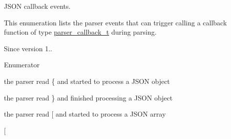 J\+S\+O\+N callback events. 

This enumeration lists the parser events that can trigger calling a callback function of type \hyperlink{classnlohmann_1_1basic__json_a9e35475e2027520a78e09f460dbe048a}{parser\+\_\+callback\+\_\+t} during parsing.

 \begin{DoxySince}{Since}
version 1.. 
\end{DoxySince}
\begin{Desc}
\item[Enumerator]\par
\begin{description}
\item[{\em 
\hypertarget{classnlohmann_1_1basic__json_aea1c863b719b4ca5b77188c171bbfafeae73f17027cb0acbb537f29d0a6944b26}{}object\+\_\+start\label{classnlohmann_1_1basic__json_aea1c863b719b4ca5b77188c171bbfafeae73f17027cb0acbb537f29d0a6944b26}
}]the parser read {\ttfamily \{} and started to process a J\+S\+O\+N object \item[{\em 
\hypertarget{classnlohmann_1_1basic__json_aea1c863b719b4ca5b77188c171bbfafeaf63e2a2468a37aa4f394fcc3bcb8249c}{}object\+\_\+end\label{classnlohmann_1_1basic__json_aea1c863b719b4ca5b77188c171bbfafeaf63e2a2468a37aa4f394fcc3bcb8249c}
}]the parser read {\ttfamily \}} and finished processing a J\+S\+O\+N object \item[{\em 
\hypertarget{classnlohmann_1_1basic__json_aea1c863b719b4ca5b77188c171bbfafeaa4388a3d92419edbb1c6efd4d52461f3}{}array\+\_\+start\label{classnlohmann_1_1basic__json_aea1c863b719b4ca5b77188c171bbfafeaa4388a3d92419edbb1c6efd4d52461f3}
}]the parser read {\ttfamily \mbox{[}} and started to process a J\+S\+O\+N array \item[{\em 
}
\end{description}
\end{Desc}
